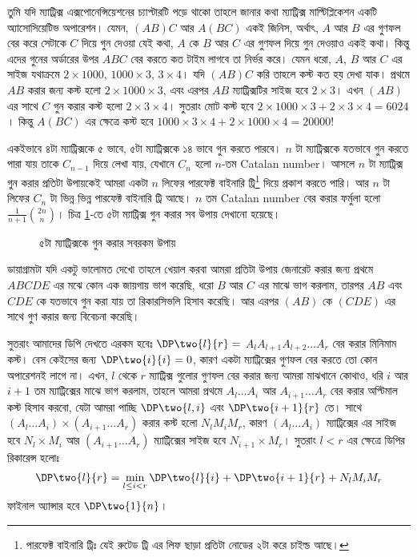 \begin{solution}
  তুমি যদি ম্যাট্রিক্স এক্সপোনেন্সিয়েশনের চ্যাপ্টারটি পড়ে থাকো তাহলে জানার
  কথা ম্যাট্রিক্স মাল্টিপ্লিকেশন একটি অ্যাসোসিয়েটিভ অপারেশন। যেমন, $(AB)C$ আর
  $A(BC)$ একই জিনিস, অর্থাৎ, $A$ আর $B$ এর গুণফল বের করে সেটাকে $C$ দিয়ে গুন
  দেওয়া যেই কথা, $A$ কে $B$ আর $C$ এর গুণফল দিয়ে গুন দেওয়াও একই কথা। কিন্তু
  এদের গুনের অর্ডারের উপর $ABC$ বের করতে কত টাইম লাগবে তা নির্ভর করে। যেমন
  ধরো, $A$, $B$ আর $C$ এর সাইজ যথাক্রমে $2 \times 1000$, $1000 \times 3$, $3
  \times 4$। যদি $(AB)C$ করি তাহলে কস্ট কত হয় দেখা যাক। প্রথমে $AB$
  করার জন্য কস্ট হলো $2 \times 1000 \times 3$, এবং এরপর $AB$ ম্যাট্রিক্সটির
  সাইজ হবে $2 \times 3$। এখন $(AB)$ এর সাথে $C$ গুন করার কস্ট হলো $2 \times 3
  \times 4$। সুতরাং মোট কস্ট হবে $2 \times 1000 \times 3 + 2 \times 3
  \times 4 = 6024$। কিন্তু $A(BC)$ এর ক্ষেত্রে কস্ট হবে $1000 \times 3 \times
  4 + 2 \times 1000 \times 4 = 20000$!

  একইভাবে ৪টা ম্যাট্রিক্সকে ৫ ভাবে, ৫টা ম্যাট্রিক্সকে ১৪ ভাবে গুন করতে পারবে।
  $n$ টা ম্যাট্রিক্সকে যতভাবে গুন করতে পারা যায় তাকে $C_{n-1}$ দিয়ে লেখা যায়,
  যেখানে $C_n$ হলো $n$-তম Catalan number। আসলে $n$ টা ম্যাট্রিক্স গুন করার
  প্রতিটা উপায়কেই আমরা একটা $n$ লিফের পারফেক্ট বাইনারি ট্রি\footnote{পারফেক্ট
  বাইনারি ট্রিঃ যেই রুটেড ট্রি এর লিফ ছাড়া প্রতিটা নোডের ২টা করে চাইল্ড আছে।
  } দিয়ে প্রকাশ করতে পারি। আর $n$ টা লিফের $C_n$ টা ভিন্ন ভিন্ন পারফেক্ট
  বাইনারি ট্রি আছে। $n$ তম Catalan number বের করার ফর্মুলা হলো $\frac{1}{n+1}
  \binom{2n}{n}$। চিত্র \ref{perfect_binary_trees_with_5_leaves}-তে ৫টা
  ম্যাট্রিক্স গুন করার সব উপায় দেখানো হয়েছে।
  \begin{figure}
    \centering
    
    \caption{৫টা ম্যাট্রিক্সকে গুন করার সবরকম উপায়}
    \label{perfect_binary_trees_with_5_leaves}
  \end{figure}

  ডায়াগ্রামটা যদি একটু ভালোমত দেখো তাহলে খেয়াল করবা আমরা প্রতিটা উপায় জেনারেট
  করার জন্য প্রথমে $ABCDE$ এর মঝে কোন এক জায়গায় ভাগ করেছি, ধরো $B$ আর $C$ এর
  মাঝে ভাগ করলাম, তারপর $AB$ এবং $CDE$ কে যতভাবে গুন করা যায় তা রিকারসিভলি
  হিসাব করেছি। আর এরপর $(AB)$ কে $(CDE)$ এর সাথে গুণ করার জন্য বিবেচনা করেছি।

  সুতরাং আমাদের ডিপি দেখতে এরকম হবেঃ $\DP \two{l}{r} = $ $A_l A_{l+1} A_{l+2}
  \dots A_{r}$ বের করার মিনিমাম কস্ট। বেস কেইসের জন্য $\DP \two{i}{i} = 0$,
  কারণ একটা ম্যাট্রিক্সের গুণফল বের করতে তো কোন অপারেশনই লাগে না। এখন, $l$
  থেকে $r$ ম্যাট্রিক্স গুলোর গুণফল বের করার জন্য আমরা মাঝখানে কোথাও, ধরি $i$
  আর $i+1$ তম ম্যাট্রিক্সের মাঝে ভাগ করলাম, তাহলে আমরা প্রথমে $A_l \dots A_i$
  আর $A_{i+1} \dots A_{r}$ বের করার অপ্টিমাল কস্ট হিসাব করবো, যেটা আমরা
  পাচ্ছি $\DP\two{l, i}$ এবং $\DP\two{i+1}{r}$ তে। সাথে $(A_l \dots A_{i})
  \times (A_{i+1} \dots A_{r})$ করার কস্ট হলো $N_l M_i M_r$, কারণ $(A_l \dots
  A_{i})$ ম্যাট্রিক্সের এর সাইজ হবে $N_l \times M_i$ আর $(A_{i+1} \dots A_r)$
  ম্যাট্রিক্সের সাইজ হবে $N_{i+1} \times M_r$। সুতরাং $l < r$ এর ক্ষেত্রে
  ডিপির রিকারেন্স হলোঃ
  \[
    \DP\two{l}{r} = \min_{l \le i < r} \DP\two{l}{i} + \DP\two{i+1}{r} + N_l
    M_i M_r
  \]
  ফাইনাল অ্যান্সার হবে $\DP\two{1}{n}$।
\end{solution}

